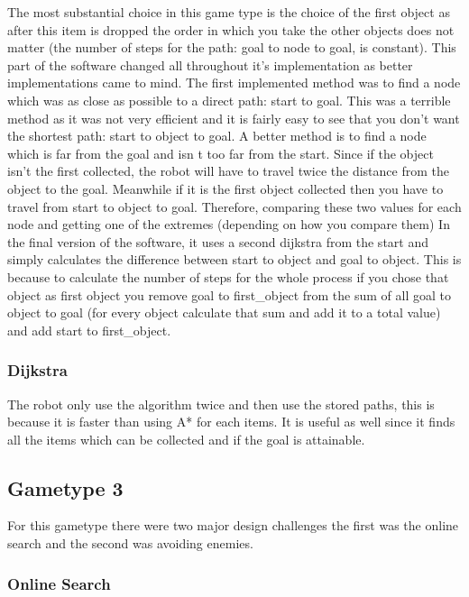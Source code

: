 \documentclass{cs255}
\begin{document}
The most substantial choice in this game type is the choice of the first object as after this item is dropped the
order in which you take the other objects does not matter (the number of steps for the path: goal to node to goal, is constant).
This part of the software changed all throughout it's implementation as better implementations came to mind.
The first implemented method was to find a node which was as close as possible to a direct path: start to goal.
This was a terrible method as it was not very efficient and it is fairly easy to see that you don't want the shortest
path: start to object to goal.
A better method is to find a node which is far from the goal and isn t too far from the start.
Since if the object isn't the first collected, the robot will have to travel twice the distance from the object to the goal.
Meanwhile if it is the first object collected then you have to travel from start to object to goal.
Therefore, comparing these two values for each node and getting one of the extremes (depending on how you compare them)
In the final version of the software, it uses a second dijkstra from the start and simply calculates the difference
between start to object and goal to object.
This is because to calculate the number of steps for the whole process if you chose that object as first object you
remove goal to first\_object from the sum of all goal to object to goal (for every object calculate that sum and add it to a
total value) and add start to first\_object.

\subsubsection{Dijkstra}

The robot only use the algorithm twice and then use the stored paths, this is because it is faster than using A* for each items.
It is useful as well since it finds all the items which can be collected and if the goal is attainable.

\subsection{Gametype 3}

For this gametype there were two major design challenges the first was the online search and the second was avoiding enemies.

\subsubsection{Online Search}
\end{document}
